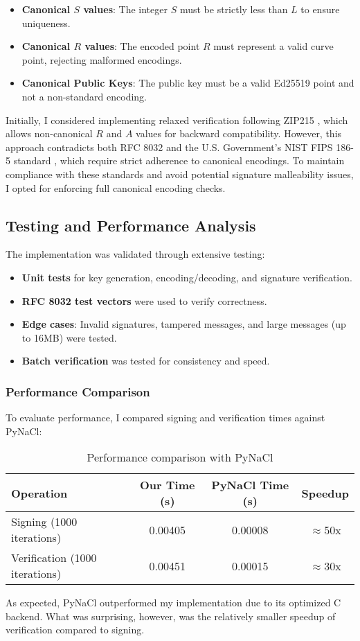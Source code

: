 \documentclass[twoside,a4paper,12pt]{article}
\begin{document}
\begin{itemize}
    \item \textbf{Canonical $S$ values}: The integer $S$ must be strictly less than $L$ to ensure uniqueness.
    \item \textbf{Canonical $R$ values}: The encoded point $R$ must represent a valid curve point, rejecting malformed encodings.
    \item \textbf{Canonical Public Keys}: The public key must be a valid Ed25519 point and not a non-standard encoding.
\end{itemize}

Initially, I considered implementing relaxed verification following ZIP215 \cite{ZIP215}, which allows non-canonical $R$ and $A$ values for backward compatibility. However, this approach contradicts both RFC 8032 and the U.S. Government's NIST FIPS 186-5 standard \cite{NIST}, which require strict adherence to canonical encodings. To maintain compliance with these standards and avoid potential signature malleability issues, I opted for enforcing full canonical encoding checks.


\subsection{Testing and Performance Analysis}
The implementation was validated through extensive testing:
\begin{itemize}
    \item \textbf{Unit tests} for key generation, encoding/decoding, and signature verification.
    \item \textbf{RFC 8032 test vectors} were used to verify correctness.
    \item \textbf{Edge cases}: Invalid signatures, tampered messages, and large messages (up to 16MB) were tested.
    \item \textbf{Batch verification} was tested for consistency and speed.
\end{itemize}

\subsubsection{Performance Comparison}
To evaluate performance, I compared signing and verification times against {PyNaCl}:

\begin{table}[h]
    \centering
    \begin{tabular}{l|c|c|c}
        \textbf{Operation} & \textbf{Our Time (s)} & \textbf{PyNaCl Time (s)} & \textbf{Speedup} \\
        \hline
        Signing (1000 iterations) & 0.00405 & 0.00008 & $\approx$50x \\
        Verification (1000 iterations) & 0.00451 & 0.00015 & $\approx$30x \\
    \end{tabular}
    \caption{Performance comparison with PyNaCl}
\end{table}
As expected, PyNaCl outperformed my implementation due to its optimized C backend. What was surprising, however, was the relatively smaller speedup of verification compared to signing. \\
\end{document}

